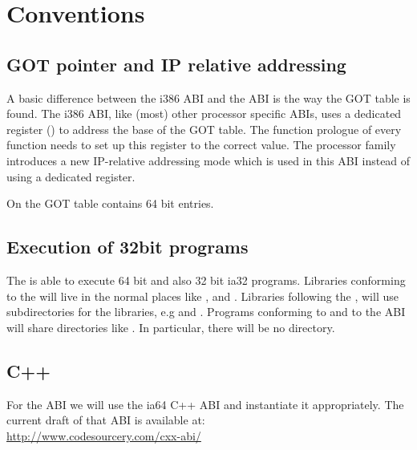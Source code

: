 \chapter{Conventions}



\section{GOT pointer and IP relative addressing}

A basic difference between the i386 ABI and the \xARCH ABI is the
way the GOT table is found.  The i386 ABI, like (most) other processor
specific ABIs, uses a dedicated register () to address the
base of the GOT table.  The function prologue of every function needs
to set up this register to the correct value.  The \xARCH processor
family introduces a new IP-relative addressing mode which is used in
this ABI instead of using a dedicated register.

On \xARCH the GOT table contains 64 bit entries.

\section{Execution of 32bit programs}


The \xARCH is able to execute 64 bit \xARCH and also 32 bit ia32
programs.  Libraries conforming to the \intelabi will live in the
normal places like ,  and .
Libraries following the \xARCH, will use  subdirectories
for the libraries, e.g  and .  Programs
conforming to \intelabi and to the \xARCH ABI will share directories
like .  In particular, there will be no 
directory.

\section{C++\label{section-cpp}}

For the  ABI we will use the ia64 C++ ABI and instantiate it
appropriately.  The current draft of that ABI is available at:\\
\url{http://www.codesourcery.com/cxx-abi/}



